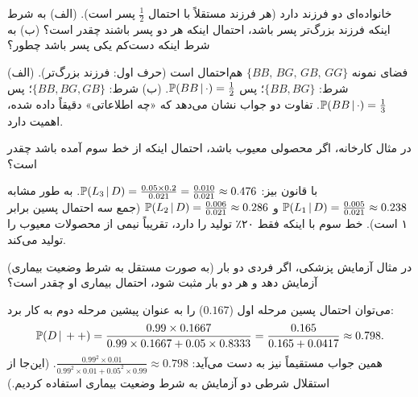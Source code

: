 \begin{exercise}[دو فرزند]
خانواده‌ای دو فرزند دارد (هر فرزند مستقلاً با احتمال $\frac12$ پسر است). (الف) به شرط اینکه فرزند بزرگ‌تر پسر باشد، احتمال اینکه هر دو پسر باشند چقدر است؟ (ب) به شرط اینکه دست‌کم یکی پسر باشد چطور؟
\end{exercise}
\begin{solution}
فضای نمونه $\{BB,\,BG,\,GB,\,GG\}$ هم‌احتمال است (حرف اول: فرزند بزرگ‌تر).
(الف) شرط: $\{BB,BG\}$؛ پس $\mathbb{P}(BB\,|\,\cdot)=\frac12$.
(ب) شرط: $\{BB,BG,GB\}$؛ پس $\mathbb{P}(BB\,|\,\cdot)=\frac13$. تفاوت دو جواب نشان می‌دهد که «چه اطلاعاتی» دقیقاً داده شده، اهمیت دارد.
\end{solution}

\begin{exercise}
در مثال کارخانه، اگر محصولی معیوب باشد، احتمال اینکه از خط سوم آمده باشد چقدر است؟
\end{exercise}
\begin{solution}
با قانون بیز:
$\mathbb{P}(L_3\,|\, D)=\frac{0.05\times0.2}{0.021}=\frac{0.010}{0.021}\approx0.476$.
به طور مشابه $\mathbb{P}(L_1\,|\, D)=\frac{0.005}{0.021}\approx0.238$ و $\mathbb{P}(L_2\,|\, D)=\frac{0.006}{0.021}\approx0.286$ (جمع سه احتمال پسین برابر ۱ است). خط سوم با اینکه فقط ۲۰٪ تولید را دارد، تقریباً نیمی از محصولات معیوب را تولید می‌کند.
\end{solution}

\begin{exercise}
در مثال آزمایش پزشکی، اگر فردی دو بار (به صورت مستقل به شرط وضعیت بیماری) آزمایش دهد و هر دو بار مثبت شود، احتمال بیماری او چقدر است؟
\end{exercise}
\begin{solution}
می‌توان احتمال پسین مرحله اول ($0.167$) را به عنوان پیشین مرحله دوم به کار برد:
\[
\mathbb{P}(D\,|\, ++)=\frac{0.99\times0.1667}{0.99\times0.1667+0.05\times0.8333}=\frac{0.165}{0.165+0.0417}\approx0.798 .
\]
همین جواب مستقیماً نیز به دست می‌آید: $\frac{0.99^2\times0.01}{0.99^2\times0.01+0.05^2\times0.99}\approx0.798$. (این‌جا از استقلال شرطی دو آزمایش به شرط وضعیت بیماری استفاده کردیم.)
\end{solution}
